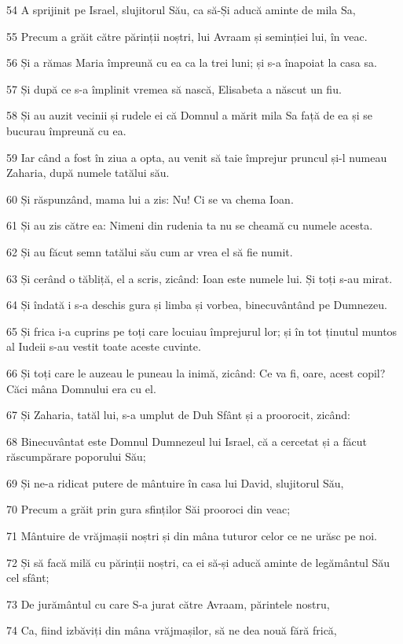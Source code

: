 \par 54 A sprijinit pe Israel, slujitorul Său, ca să-Și aducă aminte de mila Sa,
\par 55 Precum a grăit către părinții noștri, lui Avraam și seminției lui, în veac.
\par 56 Și a rămas Maria împreună cu ea ca la trei luni; și s-a înapoiat la casa sa.
\par 57 Și după ce s-a împlinit vremea să nască, Elisabeta a născut un fiu.
\par 58 Și au auzit vecinii și rudele ei că Domnul a mărit mila Sa față de ea și se bucurau împreună cu ea.
\par 59 Iar când a fost în ziua a opta, au venit să taie împrejur pruncul și-l numeau Zaharia, după numele tatălui său.
\par 60 Și răspunzând, mama lui a zis: Nu! Ci se va chema Ioan.
\par 61 Și au zis către ea: Nimeni din rudenia ta nu se cheamă cu numele acesta.
\par 62 Și au făcut semn tatălui său cum ar vrea el să fie numit.
\par 63 Și cerând o tăbliță, el a scris, zicând: Ioan este numele lui. Și toți s-au mirat.
\par 64 Și îndată i s-a deschis gura și limba și vorbea, binecuvântând pe Dumnezeu.
\par 65 Și frica i-a cuprins pe toți care locuiau împrejurul lor; și în tot ținutul muntos al Iudeii s-au vestit toate aceste cuvinte.
\par 66 Și toți care le auzeau le puneau la inimă, zicând: Ce va fi, oare, acest copil? Căci mâna Domnului era cu el.
\par 67 Și Zaharia, tatăl lui, s-a umplut de Duh Sfânt și a proorocit, zicând:
\par 68 Binecuvântat este Domnul Dumnezeul lui Israel, că a cercetat și a făcut răscumpărare poporului Său;
\par 69 Și ne-a ridicat putere de mântuire în casa lui David, slujitorul Său,
\par 70 Precum a grăit prin gura sfinților Săi prooroci din veac;
\par 71 Mântuire de vrăjmașii noștri și din mâna tuturor celor ce ne urăsc pe noi.
\par 72 Și să facă milă cu părinții noștri, ca ei să-și aducă aminte de legământul Său cel sfânt;
\par 73 De jurământul cu care S-a jurat către Avraam, părintele nostru,
\par 74 Ca, fiind izbăviți din mâna vrăjmașilor, să ne dea nouă fără frică,
